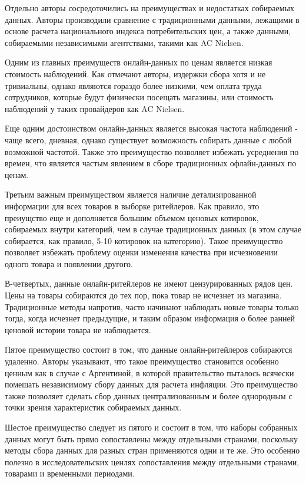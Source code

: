 Отдельно авторы сосредоточились на преимуществах и недостатках собираемых данных. Авторы производили сравнение с традиционными данными, лежащими в основе расчета национального индекса потребительских цен, а также данными, собираемыми независимыми агентствами, такими как AC Nielsen. 

Одним из главных преимуществ онлайн-данных по ценам является низкая стоимость наблюдений. Как отмечают авторы, издержки сбора хотя и не тривиальны, однако являются гораздо более низкими, чем оплата труда сотрудников, которые будут физически посещать магазины, или стоимость наблюдений у таких провайдеров как AC Nielsen.

Еще одним достоинством онлайн-данных является высокая частота наблюдений - чаще всего, дневная, однако существует возможность собирать данные с любой возможной частотой. Также это преимущество позволяет избежать усреднения по времен, что является частым явлением в сборе традиционных офлайн-данных по ценам.

Третьим важным преимуществом является наличие детализированной информации для всех товаров в выборке ритейлеров. Как правило, это преиущство еще и дополняется большим объемом ценовых котировок, собираемых внутри категорий, чем в случае традиционных данных (в этом случае собирается, как правило, 5-10 котировок на категорию). Такое преимущество позволяет избежать проблему оценки изменения качества при исчезновении одного товара и появлении другого.

В-четвертых, данные онлайн-ритейлеров не имеют цензурированных рядов цен. Цены на товары собираются до тех пор, пока товар не исчезнет из магазина. Традиционные методы напротив, часто начинают наблюдать новые товары только тогда, когда исчезнет предыдущие, и таким образом информация о более ранней ценовой истории товара не наблюдается.

Пятое преимущество состоит в том, что данные онлайн-ритейлеров собираются удаленно. Авторы указывают, что такое преимущество становится особенно ценным как в случае с Аргентиной, в которой правительство пыталось всячески помешать независимому сбору данных для расчета инфляции. Это преимущество также позволяет сделать сбор данных централизованным и более однородным с точки зрения характеристик собираемых данных.

Шестое преимущество следует из пятого и состоит в том, что наборы собранных данных могут быть прямо сопоставлены между отдельными странами, поскольку методы сбора данных для разных стран применяются одни и те же. Это особенно полезно в исследовательских ценлях сопоставления между отдельными странами, товарами и временными периодами.


